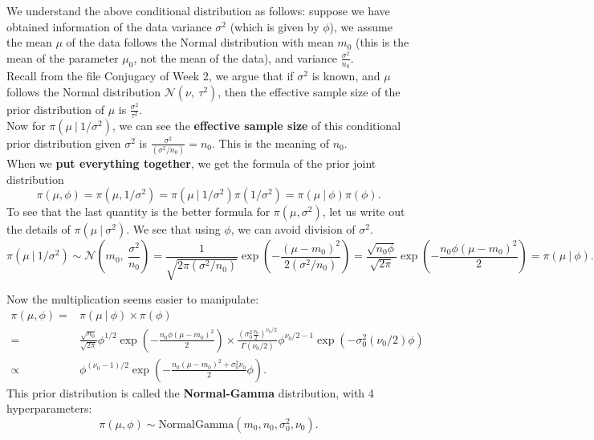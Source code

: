 \documentclass{article}
\def\dsst{\displaystyle}
\begin{document}
We understand the above conditional distribution as follows: suppose we have obtained information of the data variance $\sigma^2$ (which is given by $\phi$), we assume the mean $\mu$ of the data follows the Normal distribution with mean $m_0$ (this is the mean of the parameter $\mu_0$, not the mean of the data), and variance $\dsst \frac{\sigma^2}{n_0}$.\\

Recall from the file Conjugacy of Week 2, we argue that if $\sigma^2$ is known, and $\mu$ follows the Normal distribution $\mathcal{N}(\nu,\ \tau^2)$, then the effective sample size of the prior distribution of $\mu$ is $\dsst \frac{\sigma^2}{\tau^2}$. \\

Now for $\pi(\mu~|~1/\sigma^2)$, we can see the \textbf{effective sample size} of this conditional prior distribution given $\sigma^2$ is $\dsst \frac{\sigma^2}{(\sigma^2/n_0)} = n_0$. This is the meaning of $n_0$. \\

When we \textbf{put everything together}, we get the formula of the prior joint distribution
$$ \pi(\mu, \phi) = \pi(\mu, 1/\sigma^2) = \pi(\mu~|~1/\sigma^2)\pi(1/\sigma^2) = \pi(\mu~|~\phi)\pi(\phi). $$
To see that the last quantity is the better formula for $\pi(\mu, \sigma^2)$, let us write out the details of $\pi(\mu~|~\sigma^2)$. We see that using $\phi$, we can avoid division of $\sigma^2$.
$$ \pi(\mu~|~1/\sigma^2) \sim \mathcal{N}(m_0,\ \frac{\sigma^2}{n_0}) = \frac{1}{\sqrt{2\pi(\sigma^2/n_0)}}\exp\left(-\frac{(\mu-m_0)^2}{2(\sigma^2/n_0)}\right)= \frac{\sqrt{n_0\phi}}{\sqrt{2\pi}}\exp\left(-\frac{n_0\phi(\mu-m_0)^2}{2}\right)=\pi(\mu~|~ \phi). $$

Now the multiplication seems easier to manipulate:
\begin{align*}
\pi(\mu, \phi) = & \pi(\mu~|~\phi)\times \pi(\phi) \\
= & \frac{\sqrt{n_0}}{\sqrt{2\pi}}\phi^{1/2}\exp\left(-\frac{n_0\phi(\mu- m_0)^2}{2}\right)\times \frac{\left(\sigma_0^2\frac{\nu_0}{2}\right)^{\nu_0/2}}{\Gamma(\nu_0/2)}\phi^{\nu_0/2-1}\exp\left(-\sigma_0^2(\nu_0/2)\phi\right)\\
\propto & \phi^{(\nu_0-1)/2}\exp\left(-\frac{n_0(\mu-m_0)^2+\sigma_0^2\nu_0}{2}\phi\right).
\end{align*}
This prior distribution is called the \textbf{Normal-Gamma} distribution, with 4 hyperparameters:
$$ \pi(\mu, \phi) \sim \text{NormalGamma}(m_0, n_0, \sigma_0^2, \nu_0). $$
\end{document}
